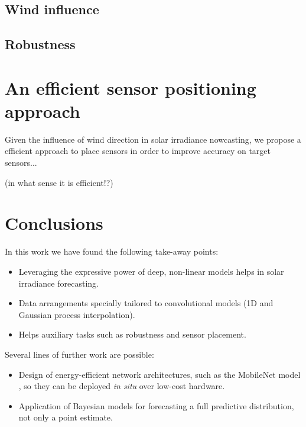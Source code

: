\documentclass[preprints,article,accept,moreauthors,pdftex]{template/mdpi}
\begin{document}
\subsection{Wind influence}\label{subsec:wind}



\subsection{Robustness}\label{subsec:robust}


\section{An efficient sensor positioning approach}\label{sec:positioning}
Given the influence of wind direction in solar irradiance nowcasting, we propose a efficient approach to place sensors in order to improve accuracy on target sensors...

(in what sense it is efficient!?)

\section{Conclusions}\label{sec:conclusions}

In this work we have found the following take-away points:

\begin{itemize}
    \item Leveraging the expressive power of deep, non-linear models helps in solar irradiance forecasting.
    \item Data arrangements specially tailored to convolutional models (1D and Gaussian process interpolation).
    \item Helps auxiliary tasks such as robustness and sensor placement.
\end{itemize}

Several lines of further work are possible:
\begin{itemize}
    \item Design of energy-efficient network architectures, such as the MobileNet model \cite{howard2017mobilenets}, so they can be deployed \emph{in situ} over low-cost hardware.
    \item Application of Bayesian models for forecasting a full predictive distribution, not only a point estimate.
\end{itemize}
\end{document}
